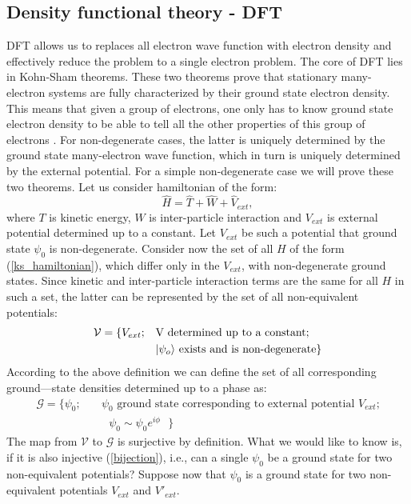 \documentclass[openany, longbibliography,slovene,a4paper,12pt]{article}
\begin{document}
\subsection{Density functional theory - DFT}
DFT allows us to replaces all electron wave function with
electron density and effectively reduce the problem to a single electron problem.
The core of DFT lies in Kohn-Sham theorems. These two theorems
prove that stationary many-electron systems are fully characterized by their
ground state electron density. This means that given a group of electrons, one
only has to know ground state electron density to be able to tell all the other
properties of this group of electrons \cite{nobel_lecture}. For non-degenerate cases, the latter is uniquely
determined by the ground state many-electron wave function, which in turn is
uniquely determined by the external potential. For a simple non-degenerate case
we will prove these two theorems.
Let us consider hamiltonian of the form:
\begin{equation} \label{ks_hamiltonian}
\hat H = \hat T + \hat W + \hat V_{ext},
\end{equation}
where $T$ is kinetic energy, $W$ is inter-particle interaction and $V_{ext}$ is
external potential determined up to a constant. Let $V_{ext}$ be such a potential
that ground state $\psi_0$ is non-degenerate. Consider now the set of all $H$ of
the form (\ref{ks_hamiltonian}), which differ only in the $V_{ext}$, with
non-degenerate ground states. Since kinetic and inter-particle interaction terms
are the same for all $H$ in such a set, the latter can be represented by the set of all non-equivalent potentials:
\begin{equation}
  \begin{split}
    \mathcal{V} = \{V_{ext};\quad &\textrm{V determined up to a constant;}\\
    & \textrm{$\ket{\psi_o}$ exists and is non-degenerate}\}
    \end{split}
 \end{equation}
According to the above definition we can define the set of all corresponding
ground---state densities determined up to a phase as:
\begin{equation}
  \begin{split}
    \mathcal{G} = \{\psi_0; \quad &\textrm{$\psi_0$ ground state corresponding to external potential $V_{ext}$;}\\
&\textrm{ $\psi_0\sim\psi_0e^{i\phi}$   }
    \}
    \end{split}
  \end{equation}
The map from $\mathcal{V}$ to $\mathcal{G}$ is surjective by definition. What we
would like to know is, if it is also injective  (\ref{bijection}), i.e., can a
single $\psi_0$ be a ground state for two non-equivalent potentials? Suppose now
that $\psi_0$ is a ground state for two non-equivalent potentials $V_{ext}$ and $V'_{ext}$.
\end{document}
